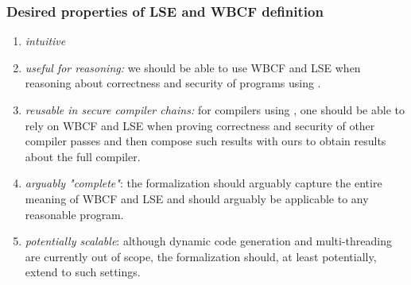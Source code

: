 \documentclass[aspectratio=169]{beamer}
\begin{document}
\begin{frame}
  \frametitle{Desired properties of LSE and WBCF definition}
  \begin{enumerate}
\item {\itshape intuitive} \label{def-prop:intuitive}
\item {\itshape useful for reasoning:} we should be able to use WBCF and LSE when reasoning about correctness and security of programs using \stktokens{}. \label{def-prop:useful}
\item {\itshape reusable in secure compiler chains:} for compilers using \stktokens{}, one should be able to rely on WBCF and LSE when proving correctness and security of other compiler passes and then compose such results with ours to obtain results about the full compiler.\label{def-prop:reusable}
\item {\itshape arguably "complete"}: the formalization should arguably capture the entire meaning of WBCF and LSE and should arguably be applicable to any reasonable program. \label{def-prop:complete}
\item {\itshape potentially scalable}: although dynamic code generation and multi-threading are currently out of scope, the formalization should, at least potentially, extend to such settings.\label{def-prop:scalable}
\end{enumerate}
\end{frame}
\end{document}

